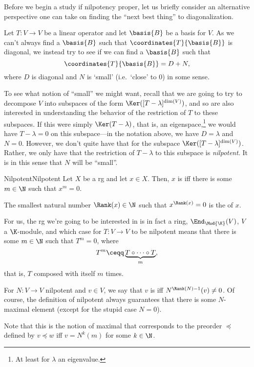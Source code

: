 Before we begin a study if nilpotency proper, let us briefly consider an alternative perspective one can take on finding the ``next best thing'' to diagonalization.

Let $T\colon V\rightarrow V$ be a linear operator and let $\basis{B}$ be a basis for $V$.  As we can't always find a $\basis{B}$ such that $\coordinates{T}{\basis{B}}$ is diagonal, we instead try to see if we can find a $\basis{B}$ such that
\begin{equation}
	\coordinates{T}{\basis{B}}=D+N,
\end{equation}
where $D$ is diagonal and $N$ is `small' (i.e.~`close' to $0$) in some sense.

To see what notion of ``small'' we might want, recall that we are going to try to decompose $V$ into subspaces of the form $\Ker ([T-\lambda ]^{\dim (V)})$, and so are also interested in understanding the behavior of the restriction of $T$ to these subspaces.  If this were simply $\Ker (T-\lambda )$, that is, an eigenspace,\footnote{At least for $\lambda$ an eigenvalue.} we would have $T-\lambda =0$ on this subspace---in the notation above, we have $D=\lambda$ and $N=0$.  However, we don't quite have that for the subspace $\Ker ([T-\lambda ]^{\dim (V)})$.  Rather, we only have that the restriction of $T-\lambda$ to this subspace is \emph{nilpotent}.  It is in this sense that $N$ will be ``small''.
\begin{dfn}{Nilpotent}{Nilpotent}
	Let $X$ be a rg and let $x\in X$.  Then, $x$ is  iff there is some $m\in \N$ such that $x^m=0$.
	\begin{rmk}
		The smallest natural number $\Rank (x)\in \N$ such that $x^{\Rank (x)}=0$ is the  of $x$.
	\end{rmk}
	\begin{rmk}
		For us, the rg we're going to be interested in is in fact a ring, $\End _{\Mod{\K}}(V)$, $V$ a $\K$-module, and which case for $T\colon V\rightarrow V$ to be nilpotent means that there is some $m\in \N$ such that $T^m=0$, where
		\begin{equation}
			T^m\ceqq \underbrace{T\circ \cdots \circ T}_m,
		\end{equation}
		that is, $T$ composed with itself $m$ times.
	\end{rmk}
	\begin{rmk}
		For $N\colon V\rightarrow V$ nilpotent and $v\in V$, we say that $v$ is  iff $N^{\Rank (N)-1}(v)\neq 0$.  Of course, the definition of nilpotent always guarantees that there is some $N$-maximal element (except for the stupid case $N=0$).
		
		Note that this is the notion of maximal that corresponds to the preorder $\preceq$ defined by $v\preceq w$ iff $v=N^k(m)$ for some $k\in \N$.
	\end{rmk}
\end{dfn}
